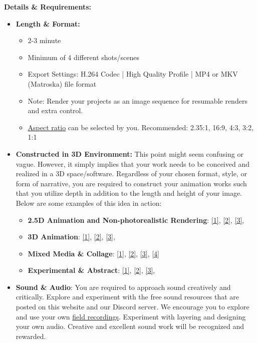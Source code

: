 \textbf{Details \& Requirements:}
\begin{itemize}
	\tightlist
	\item \textbf{Length \& Format:}
	      \begin{itemize}
		      \item 2-3 minute
		      \item Minimum of 4 different shots/scenes
		      \item Export Settings: H.264 Codec | High Quality Profile | MP4 or MKV (Matroska) file format
		      \item Note: Render your projects as an image sequence for resumable renders and extra control.
		      \item \href{https://en.wikipedia.org/wiki/Aspect_ratio_(image)#/media/File:Filmaspectratios.svg}{Aspect ratio} can be selected by you. Recommended: 2.35:1, 16:9, 4:3, 3:2, 1:1
	      \end{itemize}
	\item \textbf{Constructed in 3D Environment:} This point might seem confusing or vague. However, it simply implies that your work needs to be conceived and realized in a 3D space/software. Regardless of your chosen format, style, or form of narrative, you are required to construct your animation works such that you utilize depth in addition to the length and height of your image. Below are some examples of this idea in action:
	      \begin{itemize}
		      \item \textbf{2.5D Animation and Non-photorealistic Rendering}: \href{https://www.youtube.com/watch?v=Cl_EhU7elyo}{[1]}, \href{https://www.youtube.com/watch?v=tobqZ8fMqBk}{[2]}, \href{https://www.youtube.com/watch?v=C8puJClvNYE}{[3]},
		      \item \textbf{3D Animation}: \href{https://vimeo.com/297358261}{[1]}, \href{https://vimeo.com/385177134}{[2]}, \href{https://www.youtube.com/watch?v=8-ig_lnO7uU}{[3]},
		      \item \textbf{Mixed Media \& Collage}: \href{https://vimeo.com/167957360}{[1]}, \href{https://vimeo.com/hiradsab/outlier}{[2]}, \href{https://vimeo.com/203361631}{[3]}, \href{https://vimeo.com/181219125}{[4]}
		      \item \textbf{Experimental \& Abstract}: \href{https://vimeo.com/275668389}{[1]}, \href{https://vimeo.com/238456535}{[2]}, \href{https://vimeo.com/291430458}{[3]},
	      \end{itemize}
	\item \textbf{Sound \& Audio}: You are required to approach sound creatively and critically. Explore and experiment with the free sound resources that are posted on this website and our Discord server. We encourage you to explore and use your own \href{https://en.wikipedia.org/wiki/Field_recording}{field recordings}. Experiment with layering and designing your own audio. Creative and excellent sound work will be recognized and rewarded.

\end{itemize}
